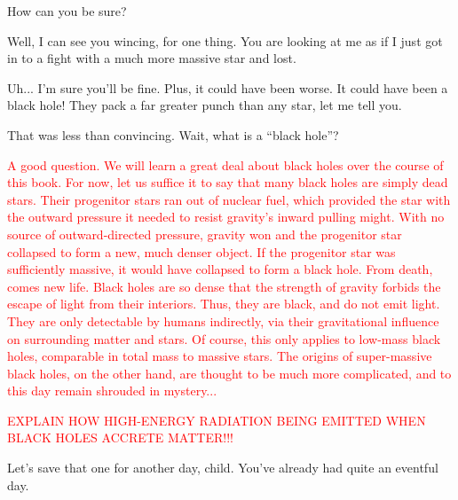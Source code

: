 \documentclass[main.tex]{subfiles}
\begin{document}
\par \Pleione How can you be sure?

\par \Maia Well, I can see you wincing, for one thing.  You are looking at me as if I just got in to a fight with a much more massive star and lost.

\par \Pleione Uh... I'm sure you'll be fine. Plus, it could have been worse.  It could have been a black hole!  They pack a far greater punch than any star, let me tell you.

\par \Maia That was less than convincing.  Wait, what is a ``black hole''?

\begin{tcolorbox}[sharp corners, colback=red!30, colframe=red!80!blue, title=Black Holes]
\par \textcolor{red} {A good question.  We will learn a great deal about black holes over the course of this book.  For now, let us suffice it to say that many black holes are simply dead stars. Their progenitor stars ran out of nuclear fuel, which provided the star with the outward pressure it needed to resist gravity's inward pulling might.  With no source of outward-directed pressure, gravity won and the progenitor star collapsed to form a new, much denser object.  If the progenitor star was sufficiently massive, it would have collapsed to form a black hole.  From death, comes new life.  Black holes are so dense that the strength of gravity forbids the escape of light from their interiors.  Thus, they are black, and do not emit light.  They are only detectable by humans indirectly, via their gravitational influence on surrounding matter and stars.  Of course, this only applies to low-mass black holes, comparable in total mass to massive stars.  The origins of super-massive black holes, on the other hand, are thought to be much more complicated, and to this day remain shrouded in mystery...}
\end{tcolorbox}

\begin{tcolorbox}[sharp corners, colback=blue!30, colframe=blue!80!blue, title=Light From Accreting Black Holes]
\par \textcolor{red} {EXPLAIN HOW HIGH-ENERGY RADIATION BEING EMITTED WHEN BLACK HOLES ACCRETE MATTER!!!}
\end{tcolorbox}


\par \Pleione Let's save that one for another day, child.  You've already had quite an eventful day.
\end{document}
